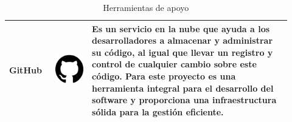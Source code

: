\begin{table}[h!]
\begin{center}
\begin{tabular}{ m{0.15\linewidth} m{0.12\linewidth} m{0.65\linewidth} }
GitHub & 
\includegraphics[height=0.1\textwidth]{figures/GitHub.png} & 
Es un servicio en la nube que ayuda a los desarrolladores a almacenar y administrar su código, al igual que llevar un registro y control de cualquier cambio sobre este código.
Para este proyecto es una herramienta integral para el desarrollo del software y proporciona una infraestructura sólida para la gestión eficiente.

\\ 
\hline

\end{tabular}
\caption{Herramientas de apoyo}
\end{center}
\end{table}
